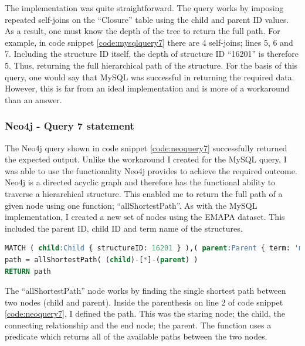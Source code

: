 The implementation was quite straightforward. The query works by imposing repeated self-joins on the ``Closure'' table using the child and parent ID values. As a result, one must know the depth of the tree to return the full path. For example, in code snippet \ref{code:mysqlquery7} there are 4 self-joins; lines 5, 6 and 7. Including the structure ID itself, the depth of structure ID ``16201'' is therefore 5. Thus, returning the full hierarchical path of the structure. For the basis of this query, one would say that MySQL was successful in returning the required data. However, this is far from an ideal implementation and is more of a workaround than an answer.

\subsubsection*{Neo4j - Query 7 statement}\label{neoquery7statement}
The Neo4j query shown in code snippet \ref{code:neoquery7} successfully returned the expected output. Unlike the workaround I created for the MySQL query, I was able to use the functionality Neo4j provides to achieve the required outcome. Neo4j is a directed acyclic graph and therefore has the functional ability to traverse a hierarchical structure. This enabled me to return the full path of a given node using one function; ``allShortestPath''. As with the MySQL implementation, I created a new set of nodes using the EMAPA dataset. This included the parent ID, child ID and term name of the structures.

\begin{lstlisting}[language=SQL, caption=Neo4j query 7 statement. Calculate transitive closure., label=code:neoquery7]
MATCH ( child:Child { structureID: 16201 } ),( parent:Parent { term: 'mouse'  } ),
path = allShortestPath( (child)-[*]-(parent) )
RETURN path
\end{lstlisting}

The ``allShortestPath'' node works by finding the single shortest path between two nodes (child and parent). Inside the parenthesis on line 2 of code snippet \ref{code:neoquery7}, I defined the path. This was the staring node; the child, the connecting relationship and the end node; the parent. The function uses a predicate which returns all of the available paths between the two nodes.

